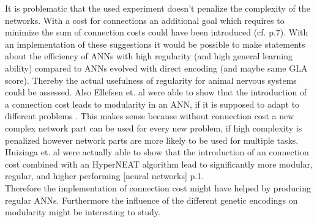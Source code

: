 \documentclass[12pt,twoside]{article}
\theoremstyle{plain}
\theoremstyle{definition}
\theoremstyle{remark}
\begin{document}
It is problematic that the used experiment doesn't penalize the complexity of the networks. With a cost for connections an additional goal which requires to minimize the sum of connection costs could have been introduced (cf. \cite{citeulike:12788284} p.7).
With an implementation of these suggestions it would be possible to make statements about the efficiency of ANNs with high regularity (and high general learning ability) compared to ANNs evolved with direct encoding (and maybe same GLA score).
Thereby the actual usefulness of regularity for animal nervous systems could be assessed.
Also Ellefsen et. al were able to show that the introduction of a connection cost leads to modularity in an ANN, if it is supposed to adapt to different problems \cite{ellefsen2015neural}. This makes sense because without connection cost a new complex network part can be used for every new problem, if high complexity is penalized however network parts are more likely to be used for multiple tasks.
Huizinga et. al were actually able to show that the introduction of an connection cost combined with an HyperNEAT algorithm lead to \glqq significantly more modular, regular, and higher performing [neural networks]\grqq \cite{huizinga2014evolving} p.1.\\
Therefore the implementation of connection cost might have helped by producing regular ANNs. Furthermore the influence of the different genetic encodings on modularity might be interesting to study.


\end{document}
